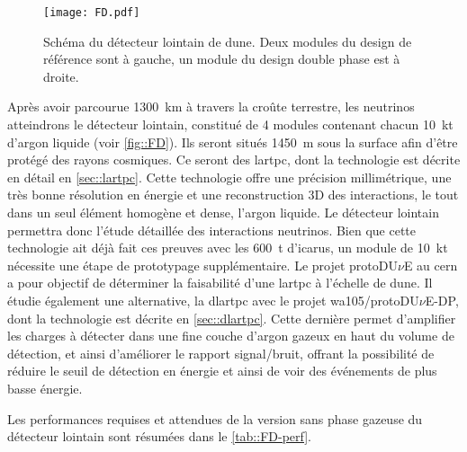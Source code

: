        \begin{figure}[htbp]
          \centering
          \texttt{[image: FD.pdf]}
          \caption[Schéma du détecteur lointain de \gls{dune}]{\label{fig::FD}Schéma du détecteur lointain de \gls{dune}. Deux modules du design de référence sont à gauche, un module du design double phase est à droite.}
        \end{figure}
        Après avoir parcourue \SI{1300}{\kilo\meter} à travers la croûte terrestre, les neutrinos atteindrons le détecteur lointain, constitué de 4 modules contenant chacun \SI{10}{\kilo\tonne} d'argon liquide (voir \autoref{fig::FD}). Ils seront situés \SI{1450}{\meter} sous la surface afin d'être protégé des rayons cosmiques. Ce seront des \acrfull{lartpc}, dont la technologie est décrite en détail en \autoref{sec::lartpc}. Cette technologie offre une précision millimétrique, une très bonne résolution en énergie et une reconstruction 3D des interactions, le tout dans un seul élément homogène et dense, l'argon liquide. Le détecteur lointain permettra donc l'étude détaillée des interactions neutrinos. Bien que cette technologie ait déjà fait ces preuves avec les \SI{600}{\tonne} d'\gls{icarus}, un module de \SI{10}{\kilo\tonne} nécessite une étape de prototypage supplémentaire. Le projet protoDU$\nu$E au \gls{cern} a pour objectif de déterminer la faisabilité d'une \gls{lartpc} à l'échelle de \gls{dune}. Il étudie également une alternative, la \gls{dlartpc} avec le projet \gls{wa105}/protoDU$\nu$E-DP, dont la technologie est décrite en \autoref{sec::dlartpc}. Cette dernière permet d'amplifier les charges à détecter dans une fine couche d'argon gazeux en haut du volume de détection, et ainsi d'améliorer le rapport signal/bruit, offrant la possibilité de réduire le seuil de détection en énergie et ainsi de voir des événements de plus basse énergie. 

        Les performances requises et attendues de la version sans phase gazeuse du détecteur lointain sont résumées dans le \autoref{tab::FD-perf}.

